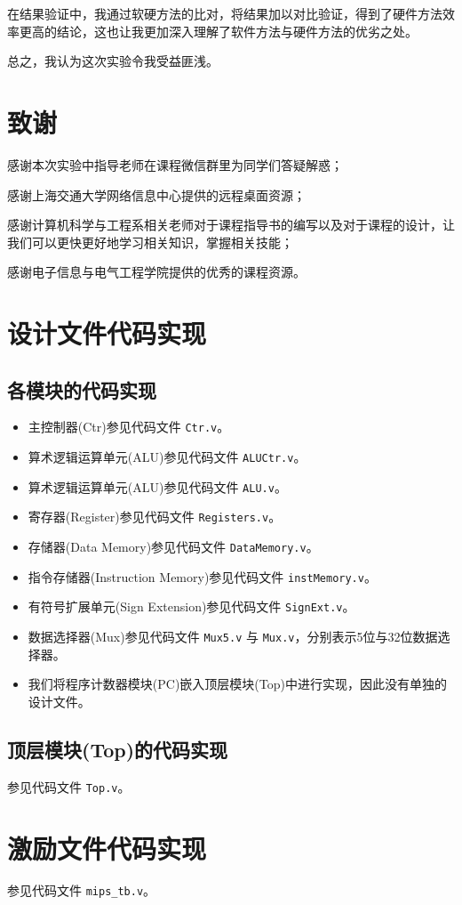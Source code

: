 \documentclass{cumcm}
\numberwithin{equation}{section}
\numberwithin{equation}{subsection}
\begin{document}
在结果验证中，我通过软硬方法的比对，将结果加以对比验证，得到了硬件方法效率更高的结论，这也让我更加深入理解了软件方法与硬件方法的优劣之处。

总之，我认为这次实验令我受益匪浅。


\section{致谢}\label{section6}
感谢本次实验中指导老师在课程微信群里为同学们答疑解惑；

感谢上海交通大学网络信息中心提供的远程桌面资源；

感谢计算机科学与工程系相关老师对于课程指导书的编写以及对于课程的设计，让我们可以更快更好地学习相关知识，掌握相关技能；

感谢电子信息与电气工程学院提供的优秀的课程资源。
%
%

\clearpage
\begin{appendices}
\section{设计文件代码实现}\label{appsection1}
\subsection{各模块的代码实现}\label{appsection1.1}

\begin{itemize}
\item 主控制器(Ctr)参见代码文件 \texttt{Ctr.v}。
\item 算术逻辑运算单元(ALU)参见代码文件 \texttt{ALUCtr.v}。
\item 算术逻辑运算单元(ALU)参见代码文件 \texttt{ALU.v}。
\item 寄存器(Register)参见代码文件 \texttt{Registers.v}。
\item 存储器(Data Memory)参见代码文件 \texttt{DataMemory.v}。
\item 指令存储器(Instruction Memory)参见代码文件 \texttt{instMemory.v}。
\item 有符号扩展单元(Sign Extension)参见代码文件 \texttt{SignExt.v}。
\item 数据选择器(Mux)参见代码文件 \texttt{Mux5.v} 与 \texttt{Mux.v}，分别表示5位与32位数据选择器。
\item 我们将程序计数器模块(PC)嵌入顶层模块(Top)中进行实现，因此没有单独的设计文件。
\end{itemize}
\subsection{顶层模块(Top)的代码实现}\label{appsection1.2}
参见代码文件 \texttt{Top.v}。
\section{激励文件代码实现}\label{appsection2}
参见代码文件 \texttt{mips\_tb.v}。
\end{appendices}
\end{document}
